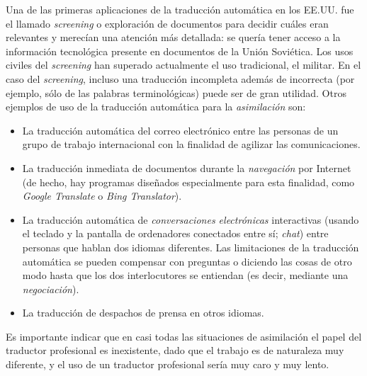 Una de las primeras aplicaciones de la traducción automática en los EE.UU. fue el llamado \emph{screening} o exploración de documentos para decidir cuáles eran relevantes y merecían una atención más detallada: se quería tener acceso a la información tecnológica presente en documentos de la Unión Soviética. Los usos civiles del \emph{screening} han superado actualmente el uso tradicional, el militar. En el caso del \emph{screening}, incluso una traducción incompleta además de incorrecta (por ejemplo, sólo de las palabras terminológicas) puede ser de gran utilidad. Otros ejemplos de uso de la traducción automática para la \emph{asimilación} son: \begin{itemize} \item La traducción automática del correo electrónico entre las personas de un grupo de trabajo internacional con la finalidad de agilizar las comunicaciones. \item La traducción inmediata de documentos durante la \emph{navegación} por Internet (de hecho, hay programas diseñados especialmente para esta finalidad, como \emph{Google Translate} o \emph{Bing Translator}). \item La traducción automática de \emph{conversaciones electrónicas} interactivas (usando el teclado y la pantalla de ordenadores conectados entre sí; \emph{chat}) entre personas que hablan dos idiomas diferentes. Las limitaciones de la traducción automática se pueden compensar con preguntas o diciendo las cosas de otro modo hasta que los dos interlocutores se entiendan (es decir, mediante una \emph{negociación}). \item La traducción de despachos de prensa en otros idiomas. \end{itemize} 

Es importante indicar que en casi todas las situaciones de asimilación el papel del traductor profesional es inexistente, dado que el trabajo es de naturaleza muy diferente, y el uso de un traductor profesional sería muy caro y muy lento. 

